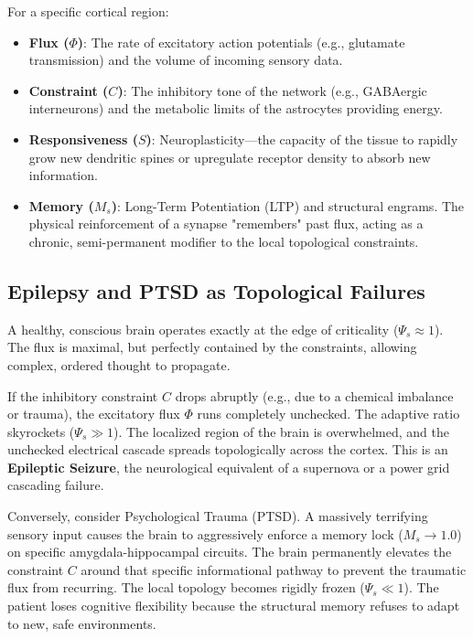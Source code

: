 \documentclass[11pt,a4paper]{article}
\begin{document}
For a specific cortical region:
\begin{itemize}
    \item \textbf{Flux ($\Phi$)}: The rate of excitatory action potentials (e.g., glutamate transmission) and the volume of incoming sensory data.
    \item \textbf{Constraint ($C$)}: The inhibitory tone of the network (e.g., GABAergic interneurons) and the metabolic limits of the astrocytes providing energy.
    \item \textbf{Responsiveness ($S$)}: Neuroplasticity---the capacity of the tissue to rapidly grow new dendritic spines or upregulate receptor density to absorb new information.
    \item \textbf{Memory ($M_s$)}: Long-Term Potentiation (LTP) and structural engrams. The physical reinforcement of a synapse "remembers" past flux, acting as a chronic, semi-permanent modifier to the local topological constraints.
\end{itemize}

\subsection{Epilepsy and PTSD as Topological Failures}
A healthy, conscious brain operates exactly at the edge of criticality ($\Psi_s \approx 1$). The flux is maximal, but perfectly contained by the constraints, allowing complex, ordered thought to propagate.

If the inhibitory constraint $C$ drops abruptly (e.g., due to a chemical imbalance or trauma), the excitatory flux $\Phi$ runs completely unchecked. The adaptive ratio skyrockets ($\Psi_s \gg 1$). The localized region of the brain is overwhelmed, and the unchecked electrical cascade spreads topologically across the cortex. This is an \textbf{Epileptic Seizure}, the neurological equivalent of a supernova or a power grid cascading failure.

Conversely, consider Psychological Trauma (PTSD). A massively terrifying sensory input causes the brain to aggressively enforce a memory lock ($M_s \to 1.0$) on specific amygdala-hippocampal circuits. The brain permanently elevates the constraint $C$ around that specific informational pathway to prevent the traumatic flux from recurring. The local topology becomes rigidly frozen ($\Psi_s \ll 1$). The patient loses cognitive flexibility because the structural memory refuses to adapt to new, safe environments.
\end{document}
